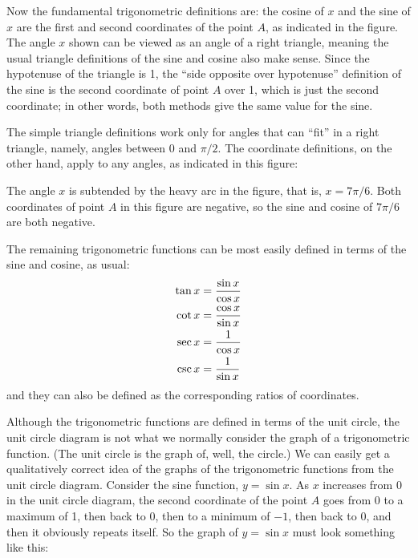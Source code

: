 Now the fundamental trigonometric definitions are:
the cosine of $x$ and the sine of $x$ are the first and second
coordinates of the point $A$, as indicated in the figure. The angle
$x$ shown can be viewed as an angle of a right triangle, meaning the
usual triangle definitions of the sine and cosine also make
sense. Since the hypotenuse of the triangle is 1, the ``side opposite
over hypotenuse'' definition of the sine is the second coordinate of
point $A$ over 1, which is just the second coordinate; in other words,
both methods give the same value for the sine.

The simple triangle definitions work only for angles that can ``fit''
in a right triangle, namely, angles between 0 and $\pi/2$. The
coordinate definitions, on the other hand, apply to any angles, as
indicated in this figure:

The angle $x$ is subtended by the heavy arc in the figure, that is, 
$x=7\pi/6$. Both coordinates of point $A$ in this figure are negative,
so the sine and cosine of $7\pi/6$ are both negative.

The remaining trigonometric functions can be most easily defined in
terms of the sine and cosine, as usual:
\begin{align*}
\tan x &= {\sin x\over \cos x} \\
\cot x &= {\cos x \over \sin x} \\
\sec x &= {1\over \cos x} \\
\csc x &= {1\over \sin x} \\
\end{align*}
and they can also be defined as the corresponding ratios of
coordinates. 

Although the trigonometric functions are defined in terms of the unit
circle, the unit circle diagram is not what we normally consider the
graph of a trigonometric function. (The unit circle is the graph of,
well, the circle.) We can easily get a qualitatively correct idea of
the graphs of the trigonometric functions from the unit circle
diagram. Consider the sine function, $y=\sin x$. As $x$ increases from
0 in the unit circle diagram, the second coordinate of the point $A$
goes from 0 to a maximum of 1, then back to 0, then to a minimum of
$-1$, then back to 0, and then it obviously repeats itself. So the
graph of $y=\sin x$ must look something like this:

